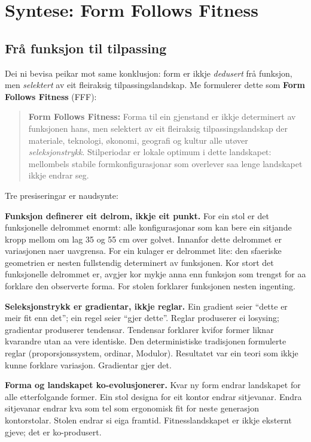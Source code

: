 \documentclass[10pt, a4paper, twocolumn]{article}
\begin{document}
\section{Syntese: Form Follows Fitness}

\subsection{Frå funksjon til tilpassing}

Dei ni bevisa peikar mot same konklusjon: form er ikkje \emph{dedusert} frå funksjon, men \emph{selektert} av eit fleiraksig tilpassingslandskap. Me formulerer dette som \textbf{Form Follows Fitness} (FFF):

\begin{quote}
\textbf{Form Follows Fitness:} Forma til ein gjenstand er ikkje determinert av funksjonen hans, men selektert av eit fleiraksig tilpassingslandskap der materiale, teknologi, økonomi, geografi og kultur alle utøver \emph{seleksjonstrykk}. Stilperiodar er lokale optimum i dette landskapet: mellombels stabile formkonfigurasjonar som overlever saa lenge landskapet ikkje endrar seg.
\end{quote}

Tre presiseringar er naudsynte:

\textbf{Funksjon definerer eit delrom, ikkje eit punkt.} For ein stol er det funksjonelle delrommet enormt: alle konfigurasjonar som kan bere ein sitjande kropp mellom om lag 35 og 55 cm over golvet. Innanfor dette delrommet er variasjonen naer uavgrensa. For ein kulager er delrommet lite: den sfaeriske geometrien er nesten fullstendig determinert av funksjonen. Kor stort det funksjonelle delrommet er, avgjer kor mykje anna enn funksjon som trengst for aa forklare den observerte forma. For stolen forklarer funksjonen nesten ingenting.

\textbf{Seleksjonstrykk er gradientar, ikkje reglar.} Ein gradient seier ``dette er meir fit enn det''; ein regel seier ``gjer dette''. Reglar produserer ei losysing; gradientar produserer tendensar. Tendensar forklarer kvifor former liknar kvarandre utan aa vere identiske. Den deterministiske tradisjonen formulerte reglar (proporsjonssystem, ordinar, Modulor). Resultatet var ein teori som ikkje kunne forklare variasjon. Gradientar gjer det.

\textbf{Forma og landskapet ko-evolusjonerer.} Kvar ny form endrar landskapet for alle etterfolgande former. Ein stol designa for eit kontor endrar sitjevanar. Endra sitjevanar endrar kva som tel som ergonomisk fit for neste generasjon kontorstolar. Stolen endrar si eiga framtid. Fitnesslandskapet er ikkje eksternt gjeve; det er ko-produsert.
\end{document}
